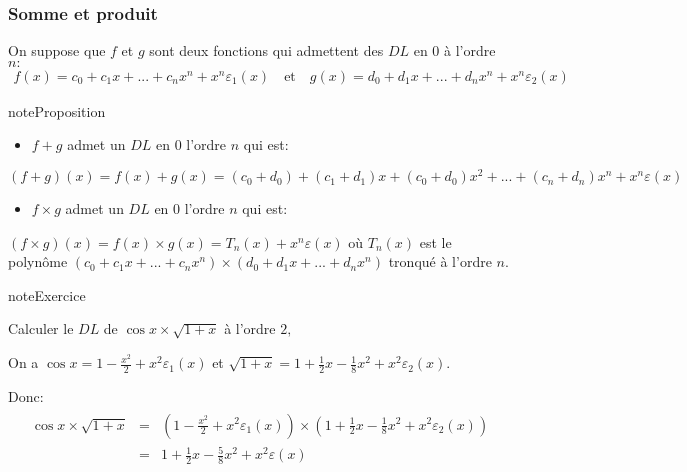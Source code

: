 \documentclass[letterpaper,10pt,french]{jupyterBook}
\begin{document}
\subsubsection{Somme et produit}
\label{\detokenize{dl:somme-et-produit}}
\sphinxAtStartPar
On suppose que \(f\) et \(g\) sont deux fonctions qui admettent des \(DL\) en \(0\) à l’ordre \(n:\)
\begin{equation*}
\begin{split}
f(x)=c_0+c_1 x+...+c_n x^n +x^n \varepsilon_1 (x)\quad\mbox{et}\quad g(x)=d_0+d_1 x+...+d_n x^n +x^n \varepsilon_2 (x)
\end{split}
\end{equation*}
\begin{sphinxadmonition}{note}{Proposition}
\begin{itemize}
\item {} 
\sphinxAtStartPar
\(f+g\) admet un \(DL\) en \(0\) l’ordre \(n\) qui est:

\end{itemize}

\sphinxAtStartPar
\((f+g)(x)=f(x)+g(x)=(c_0+d_0)+(c_1+d_1)x+(c_0+d_0)x^2+...+(c_n+d_n) x^n +x^{n}\varepsilon(x)\)
\begin{itemize}
\item {} 
\sphinxAtStartPar
\(f\times g\) admet un \(DL\) en \(0\) l’ordre \(n\) qui est:

\end{itemize}

\sphinxAtStartPar
\((f\times g)(x)=f(x)\times g(x)=T_n(x)+x^n \varepsilon(x)\) où \(T_n(x)\) est le polynôme \((c_0+c_1 x+...+c_n x^n)\times (d_0+d_1 x+...+d_n x^n)\) tronqué à l’ordre \(n.\)
\end{sphinxadmonition}

\begin{sphinxadmonition}{note}{Exercice}

\sphinxAtStartPar
Calculer le \(DL\) de \(\cos x \times\sqrt{1+x}\) à l’ordre \(2,\)

\sphinxAtStartPar
On a \(\cos x= 1-\frac{x^2}{2}+x^2 \varepsilon_1 (x)\) et \(\sqrt{1+x}=1+\frac{1}{2}x-\frac{1}{8}x^2+x^2\varepsilon_2 (x).\)

\sphinxAtStartPar
Donc:
\begin{equation*}
\begin{split}
\begin{eqnarray*}
\cos x \times\sqrt{1+x}
&=& (1-\frac{x^2}{2}+x^2 \varepsilon_1 (x))\times (1+\frac{1}{2}x-\frac{1}{8}x^2+x^2\varepsilon_2 (x))\\
&=& 1+\frac{1}{2}x-\frac{5}{8}x^2+x^2 \varepsilon(x)
\end{eqnarray*}
\end{split}
\end{equation*}\end{sphinxadmonition}
\end{document}

